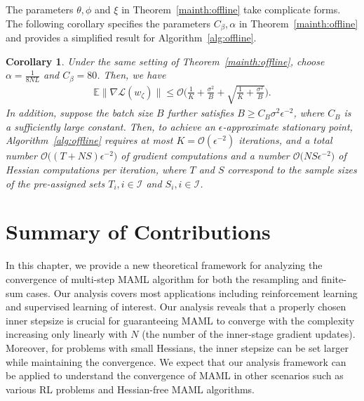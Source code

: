 \documentclass{osudissert96}
\newtheorem{corollary}{Corollary}
\begin{document}
The parameters $\theta, \phi$ and $\xi$ in Theorem~\ref{mainth:offline} take complicate forms. 
The following corollary specifies the parameters $C_\beta, \alpha$ in Theorem~\ref{mainth:offline} and 
provides a simplified result for Algorithm~\ref{alg:offline}.
\begin{corollary}\label{co:mainoffline}
	Under the same setting of Theorem~\ref{mainth:offline}, choose  $\alpha = \frac{1}{8NL}$ and $ C_\beta = 80$. Then, we have%
	\begin{align*}
	\mathbb{E}\|\nabla \mathcal{L}(w_\zeta)\|  \leq  \mathcal{O}\Big(  \frac{1}{K} +\frac{\sigma^2}{B} +\sqrt{\frac{1}{K} +\frac{\sigma^2}{B} }  \Big).
	\end{align*}
In addition, suppose the  batch size $B$ further satisfies $B\geq C_B\sigma^2\epsilon^{-2}$, where $C_B$ is a sufficiently large constant. Then, to achieve an $\epsilon$-approximate stationary point,  Algorithm~\ref{alg:offline} requires at most $K=\mathcal{O}(\epsilon^{-2})$ iterations, and a total number $\mathcal{O}\big((T+NS)\epsilon^{-2}\big)$ of gradient computations and a number $\mathcal{O}\big(NS\epsilon^{-2}\big)$ of Hessian computations per iteration, where $T$ and $S$ correspond to the sample sizes of the pre-assigned sets $T_i,i\in\mathcal{I}$ and $S_i,i\in\mathcal{I}$.
\end{corollary}


\section{Summary of Contributions}
In this chapter, we provide a new theoretical framework for analyzing the convergence of multi-step MAML algorithm for both the resampling and finite-sum cases. Our analysis covers most applications including reinforcement learning and supervised learning of interest. 
Our analysis reveals that 
a properly chosen inner stepsize is crucial for guaranteeing MAML to converge with the complexity increasing only linearly with $N$ (the number of the inner-stage gradient updates). 
Moreover, for problems with small  Hessians, the inner stepsize can be set larger while maintaining the convergence. We expect that our analysis framework can be applied to understand the convergence of MAML in other scenarios such as various RL problems and Hessian-free MAML algorithms.
\end{document}
